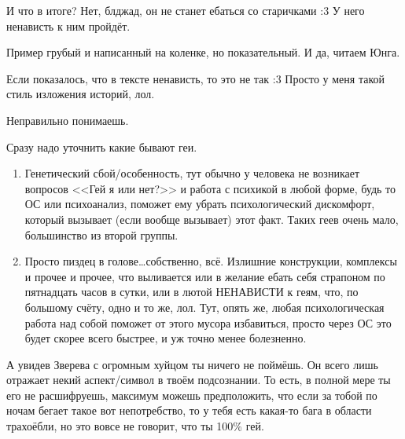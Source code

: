 \documentclass[a4paper,14pt,oneside]{memoir}
\begin{document}
И что в итоге? Нет, блджад, он не станет ебаться со старичками :3 У него ненависть к ним пройдёт. 

Пример грубый и написанный на коленке, но показательный. И да, читаем Юнга. 

Если показалось, что в тексте ненависть, то это не так :3 Просто у меня такой стиль изложения историй, лол.

\medskip


\medskip

Неправильно понимаешь.

Сразу надо уточнить какие бывают геи.

\begin{enumerate}
\item Генетический сбой/особенность, тут обычно у человека не возникает вопросов <<Гей я или нет?>> и работа с психикой в любой форме, будь то ОС или психоанализ, поможет ему убрать психологический дискомфорт, который вызывает (если вообще вызывает) этот факт. Таких геев очень мало, большинство из второй группы.
\item Просто пиздец в голове\ldots собственно, всё. Излишние конструкции, комплексы и прочее и прочее, что выливается или в желание ебать себя страпоном по пятнадцать часов в сутки, или в лютой НЕНАВИСТИ к геям, что, по большому счёту, одно и то же, лол. Тут, опять же, любая психологическая работа над собой поможет от этого мусора избавиться, просто через ОС это будет скорее всего быстрее, и уж точно менее болезненно.
\end{enumerate}


А увидев Зверева с огромным хуйцом ты ничего не поймёшь. Он всего лишь отражает некий аспект/символ в твоём подсознании. То есть, в полной мере ты его не расшифруешь, максимум можешь предположить, что если за тобой по ночам бегает такое вот непотребство, то у тебя есть какая-то бага в области трахоёбли, но это вовсе не говорит, что ты 100\% гей. 
\end{document}
